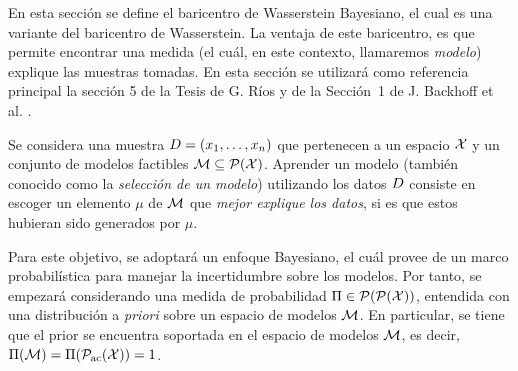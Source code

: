 En esta sección se define el baricentro de Wasserstein Bayesiano, el cual es una variante del baricentro de Wasserstein. La ventaja de este baricentro, es que permite encontrar una medida (el cuál, en este contexto, llamaremos \emph{modelo}) explique las muestras tomadas.
En esta sección se utilizará como referencia principal la sección 5 de la Tesis de G. Ríos \cite{rios2020contributions} y de la Sección~1 de J. Backhoff et al. \cite{backhoff2022bayesian}.

Se considera una muestra $\Data = \left(x_1,\ldots, x_n \right)$ que pertenecen a un espacio $\cX$ y un conjunto de modelos factibles
$\Models \subseteq \ProbSpace[\cX]$. Aprender un modelo (también conocido como la \emph{selección de un modelo}) utilizando los datos $\Data$  consiste en escoger un elemento $\mu$ de $\Models$ que \emph{mejor explique los datos}, si es que estos hubieran sido generados por $\mu$.

Para este objetivo, se adoptará un enfoque Bayesiano, el cuál provee de un marco probabilística para manejar la incertidumbre sobre los modelos. Por tanto, se empezará considerando una medida de probabilidad $\Pi \in \ProbSpace[\ProbSpace[\cX] ] $, entendida con una distribución a \textit{priori} sobre un espacio de modelos $\Models$. En particular, se tiene que el prior se encuentra soportada en el espacio de modelos $\Models$, es decir, $\Pi(\Models) = \Pi(\ProbSpaceAC[\cX] ) = 1$.

